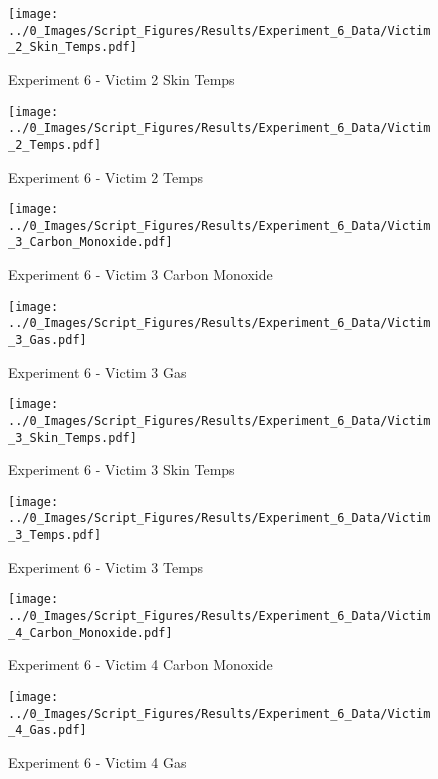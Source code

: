 	\begin{figure}[H]
		\centering
		\texttt{[image: ../0\_Images/Script\_Figures/Results/Experiment\_6\_Data/Victim\_2\_Skin\_Temps.pdf]}
		\caption[]{Experiment 6 - Victim 2 Skin Temps}
	\end{figure}
 
	\clearpage

	\begin{figure}[H]
		\centering
		\texttt{[image: ../0\_Images/Script\_Figures/Results/Experiment\_6\_Data/Victim\_2\_Temps.pdf]}
		\caption[]{Experiment 6 - Victim 2 Temps}
	\end{figure}
 

	\begin{figure}[H]
		\centering
		\texttt{[image: ../0\_Images/Script\_Figures/Results/Experiment\_6\_Data/Victim\_3\_Carbon\_Monoxide.pdf]}
		\caption[]{Experiment 6 - Victim 3 Carbon Monoxide}
	\end{figure}
 
	\clearpage

	\begin{figure}[H]
		\centering
		\texttt{[image: ../0\_Images/Script\_Figures/Results/Experiment\_6\_Data/Victim\_3\_Gas.pdf]}
		\caption[]{Experiment 6 - Victim 3 Gas}
	\end{figure}
 

	\begin{figure}[H]
		\centering
		\texttt{[image: ../0\_Images/Script\_Figures/Results/Experiment\_6\_Data/Victim\_3\_Skin\_Temps.pdf]}
		\caption[]{Experiment 6 - Victim 3 Skin Temps}
	\end{figure}
 
	\clearpage

	\begin{figure}[H]
		\centering
		\texttt{[image: ../0\_Images/Script\_Figures/Results/Experiment\_6\_Data/Victim\_3\_Temps.pdf]}
		\caption[]{Experiment 6 - Victim 3 Temps}
	\end{figure}
 

	\begin{figure}[H]
		\centering
		\texttt{[image: ../0\_Images/Script\_Figures/Results/Experiment\_6\_Data/Victim\_4\_Carbon\_Monoxide.pdf]}
		\caption[]{Experiment 6 - Victim 4 Carbon Monoxide}
	\end{figure}
 
	\clearpage

	\begin{figure}[H]
		\centering
		\texttt{[image: ../0\_Images/Script\_Figures/Results/Experiment\_6\_Data/Victim\_4\_Gas.pdf]}
		\caption[]{Experiment 6 - Victim 4 Gas}
	\end{figure}
 

